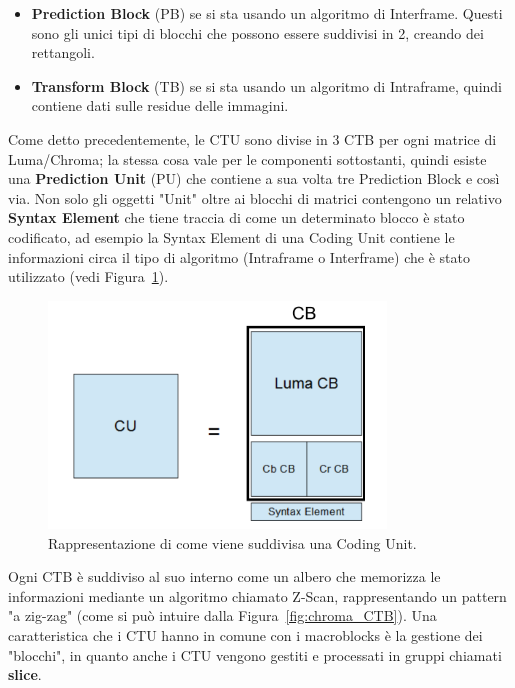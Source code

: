 \documentclass[a4paper,12pt, oneside]{article}
\begin{document}
\begin{itemize}
    \item \textbf{Prediction Block} (PB) se si sta usando un algoritmo di Interframe. Questi sono
    gli unici tipi di blocchi che possono essere suddivisi in 2, creando dei rettangoli.
    \item \textbf{Transform Block} (TB) se si sta usando un algoritmo di Intraframe, quindi contiene
    dati sulle residue delle immagini.
\end{itemize}

Come detto precedentemente, le CTU sono divise in 3 CTB per ogni matrice di Luma/Chroma; la stessa
cosa vale per le componenti sottostanti, quindi esiste una \textbf{Prediction Unit} (PU) che contiene
a sua volta tre Prediction Block e così via. Non solo gli oggetti "Unit" oltre ai blocchi di matrici
contengono un relativo \textbf{Syntax Element} che tiene traccia di come un determinato blocco è
stato codificato, ad esempio la Syntax Element di una Coding Unit contiene le informazioni circa
 il tipo di algoritmo (Intraframe o Interframe) che è stato utilizzato (vedi Figura~\ref{fig:coding_unit}).
 
 \begin{figure}[h]
    \centering
    \includegraphics[width=0.8\textwidth]{images/coding-unit.png}
    \caption{Rappresentazione di come viene suddivisa una Coding Unit.}
    \label{fig:coding_unit}
\end{figure}

 \noindent Ogni CTB è suddiviso al suo interno come un albero che memorizza le informazioni mediante un algoritmo
chiamato Z-Scan, rappresentando un pattern "a zig-zag" (come si può intuire dalla
Figura~\ref{fig:chroma_CTB}).
Una caratteristica che i CTU hanno in comune con i macroblocks è la gestione dei "blocchi",
in quanto anche i CTU vengono gestiti e processati in gruppi chiamati \textbf{slice}.
\end{document}

